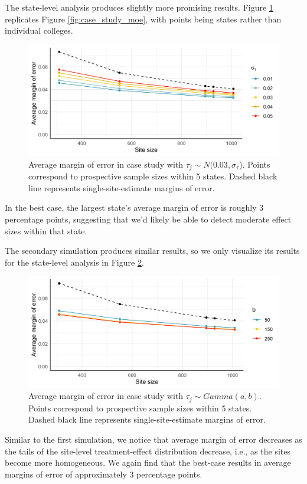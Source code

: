 \documentclass[]{article}
\begin{document}
The state-level analysis produces slightly more promising results.
Figure \ref{fig:case_study_states_moe} replicates Figure \ref{fig:case_study_moe}, with points being states rather than individual colleges.
\begin{figure}[t]
    \centering
    \includegraphics[width=\textwidth]{writeup/images/case_study_states_moe.png}
    \caption{Average margin of error in case study with $\tau_j \sim N(0.03, \sigma_\tau$). Points correspond to prospective sample sizes within 5 states. Dashed black line represents single-site-estimate margins of error.}
    \label{fig:case_study_states_moe}
\end{figure}
In the best case, the largest state's average margin of error is roughly 3 percentage points, suggesting that we'd likely be able to detect moderate effect sizes within that state.

The secondary simulation produces similar results, so we only visualize its results for the state-level analysis in Figure \ref{fig:case_study_2_states_moe}.
\begin{figure}[t]
    \centering
    \includegraphics[width=\textwidth]{writeup/images/case_study2_states_moe.png}
    \caption{Average margin of error in case study with $\tau_j \sim Gamma(a,b)$. Points correspond to prospective sample sizes within 5 states. Dashed black line represents single-site-estimate margins of error.}
    \label{fig:case_study_2_states_moe}
\end{figure}
Similar to the first simulation, we notice that average margin of error decreases as the tails of the site-level treatment-effect distribution decrease, i.e., as the sites become more homogeneous.
We again find that the best-case results in average margins of error of approximately 3 percentage points.
\end{document}
